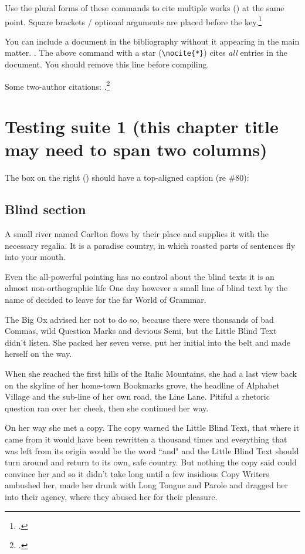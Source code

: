 \documentclass{grattan}
\begin{document}
Use the plural forms of these commands to cite multiple works (\textcites{Piketty2013}{Leigh-2013-BattlersBillionaires}) at the same point.
Square brackets / optional arguments are placed before the key.\footcites{AtkinsonStiglitz1976}[][42]{MirrleesAdamBesleyEtAl2011}


You can include a document in the bibliography without it appearing in the main matter. \nocite{ABS2012Criminalcourts2010}.
The above command with a star (\verb=\nocite{*}=) cites \emph{all} entries in the document. 
You should remove this line before compiling. 

Some two-author citations: \textcite{Norton2014Doubtfuldebtrising}.\footcites{DuckettBreadon-2014-Unlocking-skills}{Duckett-2016-Premium-policy-getting-more-from-PBS}{Norton2015Universityfeeswhat}{Norton2015cashnexushow}

\chapter{Testing suite 1 (this chapter title may need to span two columns)}\label{chap:test-1}
The box on the right () should have a top-aligned caption (re \#80):

\section{Blind section}
A small river named Carlton flows by their place and supplies it with the necessary regalia.
It is a paradise country, in which roasted parts of sentences fly into your mouth.

Even the all-powerful pointing has no control about the blind texts it is an almost non-orthographic life One day however a small line of blind text by the name of  decided to leave for the far World of Grammar.

The Big Ox advised her not to do so, because there were thousands of bad Commas, wild Question Marks and devious Semi, but the Little Blind Text didn't listen.
She packed her seven verse, put her initial into the belt and made herself on the way.

When she reached the first hills of the Italic Mountains, she had a last view back on the skyline of her home-town Bookmarks grove, the headline of Alphabet Village and the sub-line of her own road, the Line Lane.
Pitiful a rhetoric question ran over her cheek, then she continued her way.

On her way she met a copy.
The copy warned the Little Blind Text, that where it came from it would have been rewritten a thousand times and everything that was left from its origin would be the word ``and" and the Little Blind Text should turn around and return to its own, safe country.
But nothing the copy said could convince her and so it didn't take long until a few insidious Copy Writers ambushed her, made her drunk with Long Tongue and Parole and dragged her into their agency, where they abused her for their pleasure.
\end{document}
